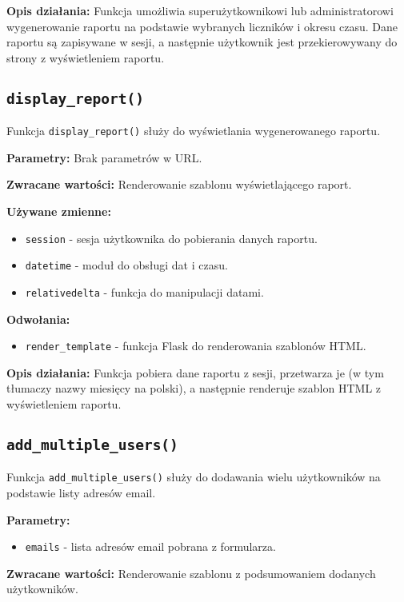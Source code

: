 \documentclass[12pt,a4paper]{report}
\begin{document}
\textbf{Opis działania:}
Funkcja umożliwia superużytkownikowi lub administratorowi wygenerowanie raportu na podstawie wybranych liczników i okresu czasu. Dane raportu są zapisywane w sesji, a następnie użytkownik jest przekierowywany do strony z wyświetleniem raportu.

\subsection{\texttt{display\_report()}}
\label{sec:display_report}
Funkcja \texttt{display\_report()} służy do wyświetlania wygenerowanego raportu.

\textbf{Parametry:} Brak parametrów w URL.

\textbf{Zwracane wartości:} Renderowanie szablonu wyświetlającego raport.

\textbf{Używane zmienne:}
\begin{itemize}
    \item \texttt{session} - sesja użytkownika do pobierania danych raportu.
    \item \texttt{datetime} - moduł do obsługi dat i czasu.
    \item \texttt{relativedelta} - funkcja do manipulacji datami.
\end{itemize}

\textbf{Odwołania:}
\begin{itemize}
    \item \texttt{render\_template} - funkcja Flask do renderowania szablonów HTML.
\end{itemize}

\textbf{Opis działania:}
Funkcja pobiera dane raportu z sesji, przetwarza je (w tym tłumaczy nazwy miesięcy na polski), a następnie renderuje szablon HTML z wyświetleniem raportu.

\subsection{\texttt{add\_multiple\_users()}}
\label{sec:add_multiple_users}
Funkcja \texttt{add\_multiple\_users()} służy do dodawania wielu użytkowników na podstawie listy adresów email.

\textbf{Parametry:}
\begin{itemize}
    \item \texttt{emails} - lista adresów email pobrana z formularza.
\end{itemize}

\textbf{Zwracane wartości:} Renderowanie szablonu z podsumowaniem dodanych użytkowników.
\end{document}
